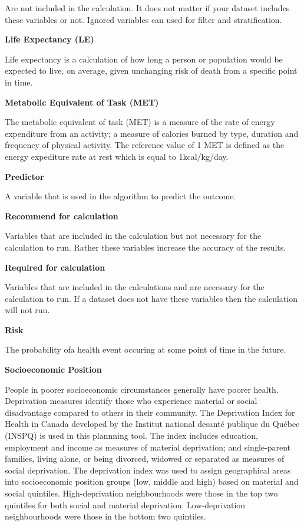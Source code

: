 \documentclass[]{book}
\begin{document}
Are not included in the calculation. It does not matter if your dataset
includes these variables or not. Ignored variables can used for filter
and stratification.

\textbf{Life Expectancy (LE)}

Life expectancy is a calculation of how long a person or
population would be expected to live, on average, given unchanging risk
of death from a specific point in time.

\textbf{Metabolic Equivalent of Task (MET)}

The metabolic equivalent of task (MET) is a measure of the rate of
energy expenditure from an activity; a measure of calories burned by
type, duration and frequency of physical activity. The reference value
of 1 MET is defined as the energy expediture rate at rest which is equal
to 1kcal/kg/day.

\textbf{Predictor}

A variable that is used in the algorithm to predict the outcome.

\textbf{Recommend for calculation}

Variables that are included in the calculation but not necessary for the
calculation to run. Rather these variables increase the accuracy of the
results.

\textbf{Required for calculation}

Variables that are included in the calculations and are necessary for
the calculation to run. If a dataset does not have these variables then
the calculation will not run.

\textbf{Risk}

The probability ofa health event occuring at some point of time in the
future.

\textbf{Socioeconomic Position}

People in poorer socioeconomic circumstances generally have poorer
health. Deprivation measures identify those who experience material or
social disadvantage compared to others in their community. The
Deprivation Index for Health in Canada developed by the Institut
national desanté publique du Québec (INSPQ)\citep{INSPQ2000} is used in
this plannning tool. The index includes education, employment and income
as measures of material deprivation; and single-parent families, living
alone, or being divorced, widowed or separated as measures of social
deprivation. The deprivation index was used to assign geographical areas
into socioeconomic position groups (low, middle and high) based on
material and social quintiles. High-deprivation neighbourhoods were
those in the top two quintiles for both social and material deprivation.
Low-deprivation neighbourhoods were those in the bottom two quintiles.
\end{document}
